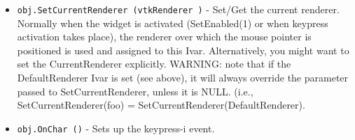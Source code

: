 \begin{itemize}
\item  \verb|obj.SetCurrentRenderer (vtkRenderer )| -  Set/Get the current renderer. Normally when the widget is activated 
 (SetEnabled(1) or when keypress activation takes place), the renderer
 over which the mouse pointer is positioned is used and assigned to
 this Ivar. Alternatively, you might want to set the CurrentRenderer
 explicitly.
 WARNING: note that if the DefaultRenderer Ivar is set (see above), 
 it will always override the parameter passed to SetCurrentRenderer,
 unless it is NULL.
 (i.e., SetCurrentRenderer(foo) = SetCurrentRenderer(DefaultRenderer).

\item  \verb|obj.OnChar ()| -  Sets up the keypress-i event. 

\end{itemize}
